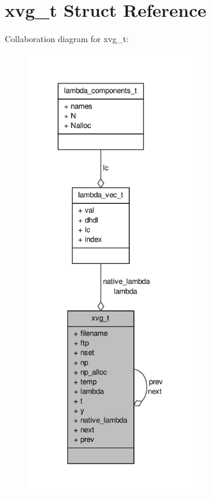 \hypertarget{structxvg__t}{\section{xvg\-\_\-t \-Struct \-Reference}
\label{structxvg__t}
}


\-Collaboration diagram for xvg\-\_\-t\-:
\nopagebreak
\begin{figure}[H]
\begin{center}
\leavevmode
\includegraphics[height=550pt]{structxvg__t__coll__graph}
\end{center}
\end{figure}
